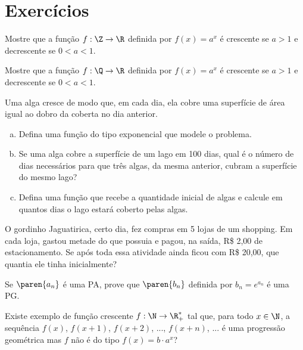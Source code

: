 \section{Exercícios}

\begin{exercise}
    Mostre que a função $f: \Z \to \R$ definida por $f(x)=a^x$ é
crescente se $a>1$ e decrescente se $0<a<1$.
\end{exercise}

\begin{exercise}
    Mostre que a função $f: \Q \to \R$ definida por $f(x)=a^x$ é
crescente se $a>1$ e decrescente se $0<a<1$.
\end{exercise}

\begin{exercise}
Uma alga cresce de modo que, em cada dia, ela cobre uma superfície de área
igual ao dobro da coberta no dia anterior.
%
\begin{enumerate}[(a)]
  \item Defina uma função do tipo exponencial que modele o problema.
  \item Se uma alga cobre a superfície de um lago em 100 dias, 
  qual é o número de dias necessários para que três algas, da 
  mesma anterior, cubram a superfície do mesmo lago?
  \item Defina uma função que recebe a quantidade inicial de algas e calcule
  em quantos dias o lago estará coberto pelas algas.
\end{enumerate}
\end{exercise}

\begin{exercise}
    O gordinho Jaguatirica, certo dia, fez compras em 5 lojas de um
shopping. Em cada loja, gastou metade do que possuia e pagou, na
saída, R\$ 2{,}00 de estacionamento. Se após toda essa atividade
ainda ficou com R\$ 20{,}00, que quantia ele tinha inicialmente?
\end{exercise}

\begin{exercise}
    Se $\paren{a_n}$ é uma PA, prove que $\paren{ b_n}$ definida por
$b_n = e^{a_n}$ é uma PG.
\end{exercise}

\begin{exercise}
    Existe exemplo de função crescente $f : \N \to \R_+^\ast$ tal
que, para todo $x \in \N$, a sequência $f(x)$, $f(x+1)$, $f(x+2)$,
..., $f(x+n)$, ... é uma progressão geométrica mas $f$ não é do tipo
$f(x) = b \cdot a^x$?
\end{exercise}

